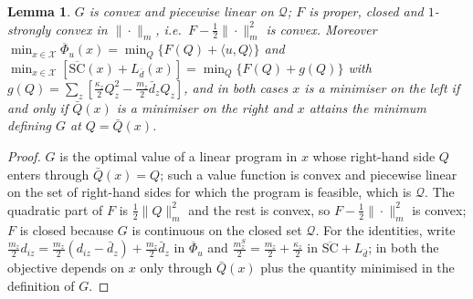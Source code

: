 \documentclass[preprint,11pt]{elsarticle}
\newtheorem{lemma}[theorem]{Lemma}
\theoremstyle{definition}
\theoremstyle{remark}
\newcommand{\ip}[2]{\langle #1,#2\rangle}
\newcommand{\cQ}{\mathcal{Q}}
\newcommand{\cX}{\mathcal{X}}
\begin{document}
\begin{lemma}\label{lem:F}
$G$ is convex and piecewise linear on $\cQ$; $F$ is proper, closed and $1$-strongly convex in $\|\cdot\|_m$, i.e.\ $F-\tfrac12\|\cdot\|_m^2$ is convex. Moreover $\min_{x\in\cX}\overline\Phi_u(x)=\min_Q\{F(Q)+\ip uQ\}$ and $\min_{x\in\cX}[\overline{\mathrm{SC}}(x)+L_{\bar d}(x)]=\min_Q\{F(Q)+g(Q)\}$ with $g(Q)=\sum_z[\tfrac{\kappa_z}{2}Q_z^2-\tfrac{m_z}{2}\bar d_zQ_z]$, and in both cases $x$ is a minimiser on the left if and only if $\bar Q(x)$ is a minimiser on the right and $x$ attains the minimum defining $G$ at $Q=\bar Q(x)$.
\end{lemma}
\begin{proof}
$G$ is the optimal value of a linear program in $x$ whose right-hand side $Q$ enters through $\bar Q(x)=Q$; such a value function is convex and piecewise linear on the set of right-hand sides for which the program is feasible, which is $\cQ$. The quadratic part of $F$ is $\tfrac12\|Q\|_m^2$ and the rest is convex, so $F-\tfrac12\|\cdot\|_m^2$ is convex; $F$ is closed because $G$ is continuous on the closed set $\cQ$. For the identities, write $\tfrac{m_z}{2}d_{iz}=\tfrac{m_z}{2}(d_{iz}-\bar d_z)+\tfrac{m_z}{2}\bar d_z$ in $\overline\Phi_u$ and $\tfrac{m^S_z}{2}=\tfrac{m_z}{2}+\tfrac{\kappa_z}{2}$ in $\overline{\mathrm{SC}}+L_{\bar d}$; in both the objective depends on $x$ only through $\bar Q(x)$ plus the quantity minimised in the definition of $G$.
\end{proof}
\end{document}
